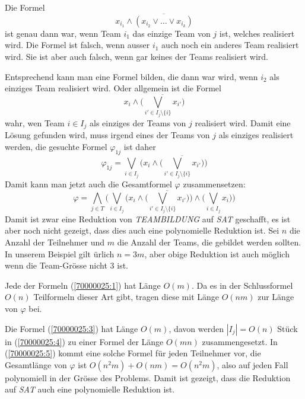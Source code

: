 \begin{loesung}
Die Formel
\begin{equation}
x_{i_1}\wedge\overline{(x_{i_2}\vee\dots\vee x_{i_k})}
\label{70000025:2}
\end{equation}
ist genau dann war, wenn Team $i_1$ das einzige Team von $j$ ist,
welches realisiert wird. Die Formel ist falsch, wenn ausser $i_1$ auch
noch ein anderes Team realisiert wird. Sie ist aber auch falsch, wenn 
gar keines der Teams realisiert wird.

Entsprechend kann man eine Formel bilden, die dann war wird, wenn $i_2$ als 
einziges Team realisiert wird. Oder allgemein ist
die Formel
\begin{equation}
x_i\wedge \overline{\biggl(\bigvee_{i'\in I_j\setminus\{i\}}x_{i'}\biggr)}
\label{70000025:3}
\end{equation}
wahr, wen Team $i\in I_j$ als einziges der Teams von $j$ realisiert wird.
Damit eine Lösung gefunden wird, muss irgend eines der Teams von $j$ als
einziges realisiert werden,
die gesuchte Formel $\varphi_{1j}$ ist daher
\begin{equation}
\varphi_{1j} = 
\bigvee_{i\in I_j} \biggl(x_i\wedge
	\overline{\biggl(\bigvee_{i'\in I_j\setminus \{i\}}x_{i'}\biggr)}\biggr)
\label{70000025:4}
\end{equation}
Damit kann man jetzt auch die Gesamtformel $\varphi$ zusammensetzen:
\begin{equation}
\varphi=
\bigwedge_{j\in T}
\biggl(
\bigvee_{i\in I_j} \biggl(x_i\wedge
	\overline{\biggl(\bigvee_{i'\in I_j\setminus \{i\}}x_{i'}\biggr)}\biggr)
\wedge
\biggl(
\bigvee_{i\in I_j}x_i
\biggr)
\biggr)
\label{70000025:5}
\end{equation}
Damit ist zwar eine Reduktion von \textsl{TEAMBILDUNG} auf \textsl{SAT}
geschafft, es ist aber noch nicht gezeigt, dass dies auch eine polynomielle
Reduktion ist. Sei $n$ die Anzahl der Teilnehmer und $m$ die Anzahl der
Teams, die gebildet werden sollten. In unserem Beispiel gilt ürlich $n=3m$,
aber obige Reduktion ist auch möglich wenn die Team-Grösse nicht $3$
ist.

Jede der Formeln (\ref{70000025:1}) hat Länge $O(m)$.
Da es in der Schlussformel $O(n)$ Teilformeln dieser Art gibt, 
tragen diese mit Länge $O(nm)$ zur Länge von $\varphi$ bei.

Die Formel (\ref{70000025:3}) hat Länge $O(m)$, davon werden $|I_j|=O(n)$
Stück
in (\ref{70000025:4}) zu einer Formel der Länge $O(mn)$ zusammengesetzt.
In (\ref{70000025:5}) kommt eine solche Formel für jeden Teilnehmer vor,
die Gesamtlänge von $\varphi$ ist $O(n^2m) + O(nm)=O(n^2m)$, also auf
jeden Fall polynomiell in der Grösse des Problems. Damit ist gezeigt,
dass die Reduktion auf \textsl{SAT} auch eine polynomielle Reduktion ist.
\end{loesung}

